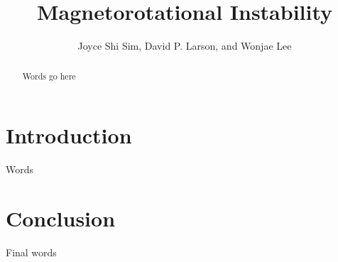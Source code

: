 \documentclass[10pt]{article}
\title{Magnetorotational Instability}
\author{Joyce Shi Sim, David P. Larson, and Wonjae Lee}
\begin{document}
\maketitle


\begin{abstract}
Words go here
\end{abstract}



\section{Introduction}
Words



\section{Conclusion}
Final words
\end{document}
